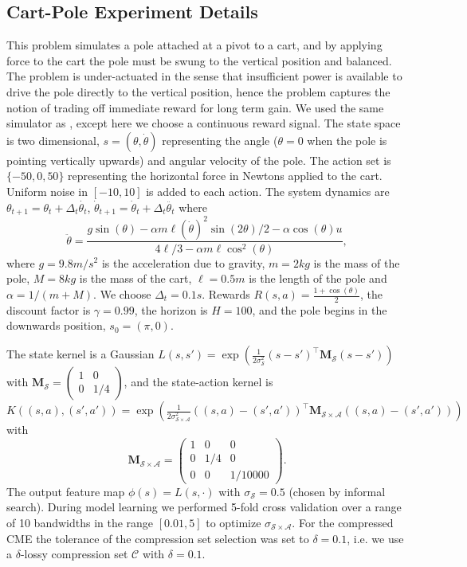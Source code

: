 \documentclass[letterpaper]{article}
\newcommand{\cC}{{\mathcal C}}
\newcommand{\cA}{{\mathcal A}}
\newcommand{\cS}{{\mathcal S}}
\newcommand{\bM}{{\bm M}}
\begin{document}
\subsection{Cart-Pole Experiment Details}

This problem simulates a pole attached at a pivot to a cart, and by applying force to the cart the pole must be swung to the vertical position and balanced. The problem is under-actuated in the sense that insufficient power is available to drive the pole directly to the vertical position, hence the problem captures the notion of trading off immediate reward for long term gain. We used the same simulator as \citet{DBLP:journals/jmlr/LagoudakisP03}, except here we choose a continuous reward signal. The state space is two dimensional, $s = (\theta, \dot{\theta})$ representing the angle ($\theta = 0$ when the pole is pointing vertically upwards) and angular velocity of the pole. The action set is $\{-50,0,50\}$ representing the horizontal force in Newtons applied to the cart. Uniform noise in $[-10,10]$ is added to each action. The system dynamics are $\theta_{t+1} = \theta_t + \Delta_t \dot {\theta_t}$, $\dot\theta_{t+1} = \dot\theta_t + \Delta_t \ddot {\theta_t}$ where
$$ \ddot {\theta} = \frac{g \sin(\theta) - \alpha m \ell (\dot{\theta})^2 \sin(2 \theta)/2 - \alpha \cos(\theta) u}{ 4\ell / 3 - \alpha m \ell \cos^2(\theta)}, $$
where $g=9.8m/s^2$ is the acceleration due to gravity, $m=2kg$ is the mass of the pole, $M = 8kg$ is the mass of the cart, $\ell = 0.5m$ is the length of the pole and $\alpha = 1/(m+M)$. We choose $\Delta_t = 0.1s$. Rewards $R(s,a) = \frac{1+ \cos(\theta)}{2}$, the discount factor is $\gamma = 0.99$, the horizon is $H=100$, and the pole begins in the downwards position, $s_0 = (\pi,0)$.

The state kernel is a Gaussian $L(s,s') = \exp\left({\frac{1}{2\sigma_{\cS}^2}(s - s')^\top \bM_\cS (s - s')}\right)$ with $\bM_\cS =\left( \begin{array}{cc}
1 & 0 \\
0 & 1/4 \end{array} \right)$, and the state-action kernel is  $K((s,a),(s',a')) = \exp\left({\frac{1}{2\sigma_{\cS\times\cA}^2}((s,a) - (s',a'))^\top \bM_{\cS\times\cA} ((s,a) - (s',a'))}\right)$ with
$$\bM_{\cS\times\cA} =\left( \begin{array}{ccc}
1 & 0 & 0\\
0 & 1/4 & 0\\
0 & 0 & 1/10000 \end{array} \right).$$ The output feature map $\phi(s) = L(s,\cdot)$ with $\sigma_{\cS} = 0.5$ (chosen by informal search). During model learning we performed 5-fold cross validation over a range of 10 bandwidths in the range $[0.01,5]$ to optimize $\sigma_{\cS\times\cA}$. For the compressed CME the tolerance of the compression set selection was set to $\delta = 0.1$, i.e. we use a $\delta$-lossy compression set $\cC$ with $\delta=0.1$.
\end{document}
